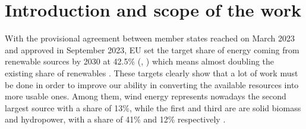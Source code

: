 \newpage
\section{Introduction and scope of the work}\label{sec:b_introduction}
With the provisional agreement between member states reached on March 2023 and approved in September 2023, EU set the target share of energy coming from renewable sources by 2030 at 42.5\% (\cite{rauters}, \cite{EU_targets}) which means almost doubling the existing share of renewables \cite{EU_targets}. These targets clearly show that a lot of work must be done in order to improve our ability in converting the available resources into more usable ones. Among them, wind energy represents nowadays the second largest source with a share of 13\%, while the first and third are are solid biomass and hydropower, with a share of 41\% and 12\% respectively \cite{ren_share}. 


